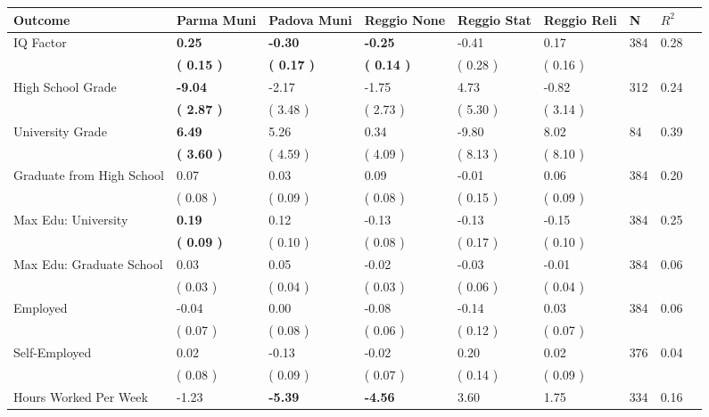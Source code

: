 \begin{tabular}{L{6.2cm} C{1.8cm} C{1.8cm} C{1.8cm} C{1.8cm} C{1.8cm} C{1.8cm} C{0.3cm} C{0.3cm}}
\toprule
 \textbf{Outcome} & \textbf{Parma Muni} & \textbf{Padova Muni} & \textbf{Reggio None} & \textbf{Reggio Stat} & \textbf{Reggio Reli} & \textbf{N} & \textbf{$ R^2$} \\
\midrule
IQ Factor & \textbf{     0.25} & \textbf{    -0.30} & \textbf{    -0.25} &     -0.41 &      0.17  & 384 &       0.28 \\ 
 & \textbf{(     0.15 )} & \textbf{(     0.17 )} & \textbf{(     0.14 )} & (     0.28 ) & (     0.16 )  & \\
High School Grade & \textbf{    -9.04} &     -2.17 &     -1.75 &      4.73 &     -0.82  & 312 &       0.24 \\ 
 & \textbf{(     2.87 )} & (     3.48 ) & (     2.73 ) & (     5.30 ) & (     3.14 )  & \\
University Grade & \textbf{     6.49} &      5.26 &      0.34 &     -9.80 &      8.02  & 84 &       0.39 \\ 
 & \textbf{(     3.60 )} & (     4.59 ) & (     4.09 ) & (     8.13 ) & (     8.10 )  & \\
Graduate from High School &      0.07 &      0.03 &      0.09 &     -0.01 &      0.06  & 384 &       0.20 \\ 
 & (     0.08 ) & (     0.09 ) & (     0.08 ) & (     0.15 ) & (     0.09 )  & \\
Max Edu: University & \textbf{     0.19} &      0.12 &     -0.13 &     -0.13 &     -0.15  & 384 &       0.25 \\ 
 & \textbf{(     0.09 )} & (     0.10 ) & (     0.08 ) & (     0.17 ) & (     0.10 )  & \\
Max Edu: Graduate School &      0.03 &      0.05 &     -0.02 &     -0.03 &     -0.01  & 384 &       0.06 \\ 
 & (     0.03 ) & (     0.04 ) & (     0.03 ) & (     0.06 ) & (     0.04 )  & \\
Employed &     -0.04 &      0.00 &     -0.08 &     -0.14 &      0.03  & 384 &       0.06 \\ 
 & (     0.07 ) & (     0.08 ) & (     0.06 ) & (     0.12 ) & (     0.07 )  & \\
Self-Employed &      0.02 &     -0.13 &     -0.02 &      0.20 &      0.02  & 376 &       0.04 \\ 
 & (     0.08 ) & (     0.09 ) & (     0.07 ) & (     0.14 ) & (     0.09 )  & \\
Hours Worked Per Week &     -1.23 & \textbf{    -5.39} & \textbf{    -4.56} &      3.60 &      1.75  & 334 &       0.16 \\ 

\end{tabular}
